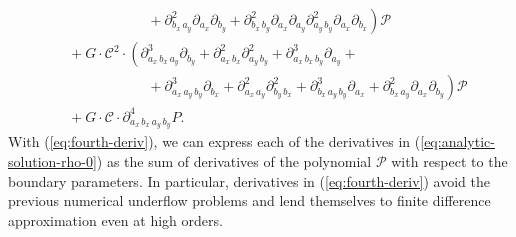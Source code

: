\documentclass[10pt]{article}
\begin{document}
\begin{align}
                                                                                             & \left. \qquad\qquad\qquad +\partial^2_{b_x\, a_y} \partial_{a_x} \partial_{b_y} + \partial^2_{b_x\, b_y} \partial_{a_x} \partial_{a_y} \partial^2_{a_y\, b_y} \partial_{a_x} \partial_{b_x} \right) \mathcal{P} \nonumber \\
                                                                                             &\,\, + G \cdot \mathcal{C}^2 \cdot \left( \partial^3_{a_x\,b_x\,a_y} \partial_{b_y} + \partial^2_{a_x\,b_x}\partial^2_{a_y\,b_y} + \partial^3_{a_x\,b_x\,b_y}\partial_{a_y}  + \right. \nonumber \\
                                                                                             & \left. \qquad\qquad\qquad + \partial^3_{a_x\,a_y\,b_y} \partial_{b_x} + \partial^2_{a_x\,a_y} \partial^2_{b_y\,b_x} + \partial^3_{b_x\,a_y\,b_y}\partial_{a_x} + \partial^2_{b_x\,a_y}\partial_{a_x}\partial_{b_y} \right) \mathcal{P} \nonumber \\
                                                                                             &\,\, + G \cdot \mathcal{C} \cdot \partial^4_{a_x\,b_x\,a_y\,b_y} P. \label{eq:fourth-deriv}
\end{align}
With (\ref{eq:fourth-deriv}), we can express each of the derivatives
in (\ref{eq:analytic-solution-rho-0}) as the sum of derivatives of the
polynomial $\mathcal{P}$ with respect to the boundary parameters. In
particular, derivatives in (\ref{eq:fourth-deriv}) avoid the previous
numerical underflow problems and lend themselves to finite difference
approximation even at high orders.
\end{document}

